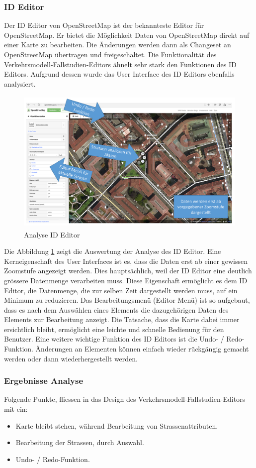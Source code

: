 \subsubsection{ID Editor}
Der ID Editor von OpenStreetMap ist der bekannteste Editor für OpenStreetMap. Er bietet die Möglichkeit Daten von OpenStreetMap direkt auf einer Karte zu bearbeiten. Die Änderungen werden dann als Changeset an OpenStreetMap übertragen und freigeschaltet. Die Funktionalität des Verkehrsmodell-Fallstudien-Editors ähnelt sehr stark den Funktionen des ID Editors. Aufgrund dessen wurde das User Interface des ID Editors ebenfalls analysiert.
\begin{figure}[H]
\centering
\includegraphics[height=7cm]{images/AnalyseIDEditor.png}
\caption{Analyse ID Editor}
\label{fig:ideditor}
\end{figure}
\noindent
Die Abbildung \ref{fig:ideditor}  zeigt die Auswertung der Analyse des ID Editor. Eine Kerneigenschaft des User Interfaces ist es, dass die Daten erst ab einer gewissen Zoomstufe angezeigt werden. Dies hauptsächlich, weil der ID Editor eine deutlich grössere Datenmenge verarbeiten muss. Diese Eigenschaft ermöglicht es dem ID Editor, die Datenmenge, die zur selben Zeit dargestellt werden muss, auf ein Minimum zu reduzieren. Das Bearbeitungsmenü (Editor Menü) ist so aufgebaut, dass es nach dem Auswählen eines Elements die dazugehörigen Daten des Elements zur Bearbeitung anzeigt. Die Tatsache, dass die Karte dabei immer ersichtlich bleibt, ermöglicht eine leichte und schnelle Bedienung für den Benutzer. Eine weitere wichtige Funktion des ID Editors ist die Undo- / Redo-Funktion. Änderungen an Elementen können einfach wieder rückgängig gemacht werden oder dann wiederhergestellt werden.
\subsubsection*{Ergebnisse Analyse}
Folgende Punkte, fliessen in das Design des Verkehrsmodell-Fallstudien-Editors mit ein:
\begin{itemize}
\itemsep0em
\item Karte bleibt stehen, während Bearbeitung von Strassenattributen.
\item Bearbeitung der Strassen, durch Auswahl.
\item Undo- / Redo-Funktion.
\end{itemize}
\newpage
